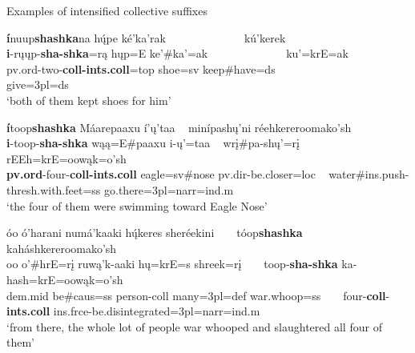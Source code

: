 \begin{exe}

\item\label{ExSHKA1} Examples of intensified collective suffixes

	\begin{xlist}
	
	\item \glll \textbf{í}nuup\textbf{shashka}na hų́pe ké'ka'rak ~ ~ ~ ~ ~ ~ ~ ~ kú'kerek\\
	\textbf{i}-rųųp-\textbf{sha-shka}=rą hųp=E ke'\#ka'=ak ~ ~ ~ ~ ~ ~ ~ ~  ku'=krE=ak\\
	pv.ord-\textnormal{two}-\textbf{coll-ints.coll}=top \textnormal{shoe}=sv \textnormal{keep}\#\textnormal{have}=ds ~ ~ ~ ~ ~ ~ ~ ~ \textnormal{give}=3pl=ds\\
	\glt `both of them kept shoes for him' \citep[109]{hollow1973a}
	
	\item \glll \textbf{í}toop\textbf{shashka} Máarepaaxu í'ų'taa ~  minípashų'ni réehkereroomako'sh\\
	\textbf{i}-toop-\textbf{sha-shka} wąą=E\#paaxu i-ų'=taa ~  wrį\#pa-shų'=rį rEEh=krE=oowąk=o'sh\\
	\textbf{pv.ord}-\textnormal{four}-\textbf{coll-ints.coll} \textnormal{eagle}=sv\#\textnormal{nose} pv.dir-\textnormal{be.closer}=loc ~  \textnormal{water}\#ins.push-\textnormal{thresh.with.feet}=ss \textnormal{go.there}=3pl=narr=ind.m\\
	\glt `the four of them were swimming toward Eagle Nose' \citep[295]{hollow1973b}
	
	\item \glll	óo ó'harani numá'kaaki hų́keres sheréekini ~  ~ tóop\textbf{shashka} kaháshkereroomako'sh\\
	oo o'\#hrE=rį ruwą'k-aaki hų=krE=s shreek=rį ~ ~   toop-\textbf{sha-shka} ka-hash=krE=oowąk=o'sh\\
	dem.mid \textnormal{be}\#caus=ss \textnormal{person}-coll \textnormal{many}=3pl=def \textnormal{war.whoop}=ss ~ ~  \textnormal{four}-\textbf{coll}-\textbf{ints.coll} ins.frce-\textnormal{be.disintegrated}=3pl=narr=ind.m\\
	\glt `from there, the whole lot of people war whooped and slaughtered all four of them' \citep[255]{hollow1973b}
	
	\end{xlist}

\end{exe}

